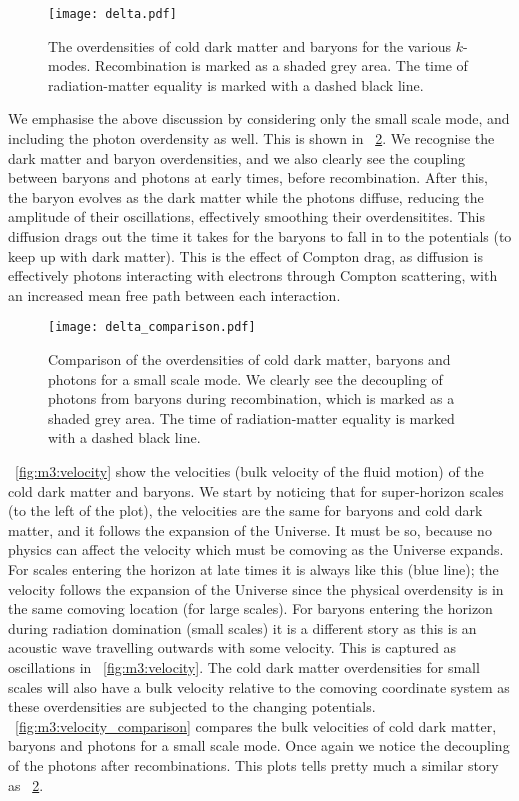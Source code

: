     \begin{figure}
        \texttt{[image: delta.pdf]}
        \caption{The overdensities of cold dark matter and baryons for the various $k$-modes. Recombination is marked as a shaded grey area. The time of radiation-matter equality is marked with a dashed black line.}
        \label{fig:m3:delta}
    \end{figure}
    
    We emphasise the above discussion by considering only the small scale mode, and including the photon overdensity as well. This is shown in ~\cref{fig:m3:delta_comparison}. We recognise the dark matter and baryon overdensities, and we also clearly see the coupling between baryons and photons at early times, before recombination. After this, the baryon evolves as the dark matter while the photons diffuse, reducing the amplitude of their oscillations, effectively smoothing their overdensitites. This diffusion drags out the time it takes for the baryons to fall in to the potentials (to keep up with dark matter). This is the effect of Compton drag, as diffusion is effectively photons interacting with electrons through Compton scattering, with an increased mean free path between each interaction. 

    \begin{figure}
        \texttt{[image: delta\_comparison.pdf]}
        \caption{Comparison of the overdensities of cold dark matter, baryons and photons for a small scale mode. We clearly see the decoupling of photons from baryons during recombination, which is marked as a shaded grey area. The time of radiation-matter equality is marked with a dashed black line. }
        \label{fig:m3:delta_comparison}
    \end{figure}

    ~\cref{fig:m3:velocity} show the velocities (bulk velocity of the fluid motion) of the cold dark matter and baryons. We start by noticing that for super-horizon scales (to the left of the plot), the velocities are the same for baryons and cold dark matter, and it follows the expansion of the Universe. It must be so, because no physics can affect the velocity which must be comoving as the Universe expands. For scales entering the horizon at late times it is always like this (blue line); the velocity follows the expansion of the Universe since the physical overdensity is in the same comoving location (for large scales). For baryons entering the horizon during radiation domination (small scales) it is a different story as this is an acoustic wave travelling outwards with some velocity. This is captured as oscillations in ~\cref{fig:m3:velocity}. The cold dark matter overdensities for small scales will also have a bulk velocity relative to the comoving coordinate system as these overdensities are subjected to the changing potentials. ~\cref{fig:m3:velocity_comparison} compares the bulk velocities of cold dark matter, baryons and photons for a small scale mode. Once again we notice the decoupling of the photons after recombinations. This plots tells pretty much a similar story as ~\cref{fig:m3:delta_comparison}.

